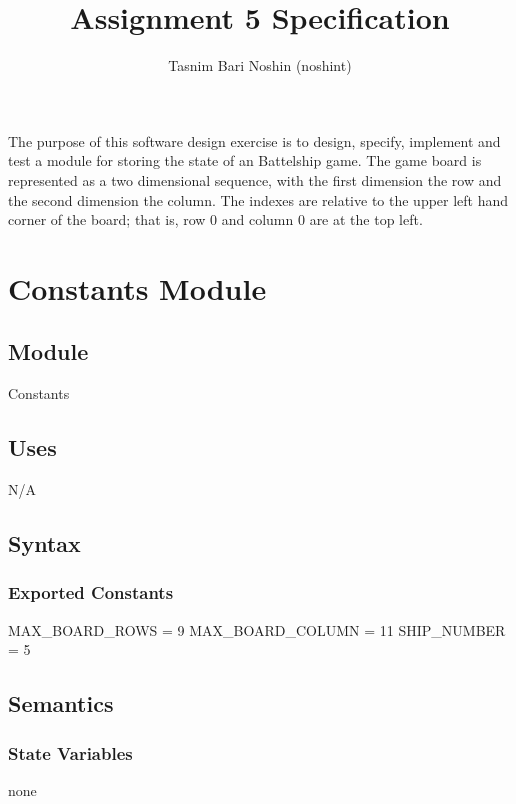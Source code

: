 \documentclass[12pt]{article}
\title{Assignment 5 Specification}
\author{Tasnim Bari Noshin (noshint)}
\begin{document}
\maketitle

The purpose of this software design exercise is to design, specify, implement and test a module for storing the state
of an Battelship game.  The game board is represented as a two dimensional sequence, with the first dimension the row and
the second dimension the column.  The indexes are relative to the upper left hand corner of the board; that is, row 0
and column 0 are at the top left.

\section* {Constants Module}

\subsection*{Module}

Constants

\subsection* {Uses}

N/A

\subsection* {Syntax}

\subsubsection* {Exported Constants}

MAX\_BOARD\_ROWS = 9 
\newline
MAX\_BOARD\_COLUMN = 11
\newline
SHIP\_NUMBER = 5


\subsection* {Semantics}

\subsubsection* {State Variables}

none

\newpage
\end{document}
